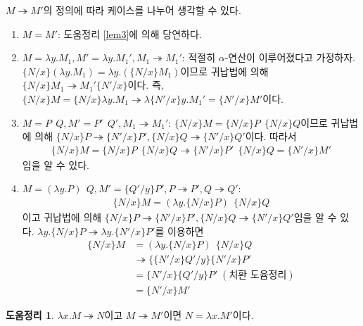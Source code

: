 \documentclass[b5paper, 11pt]{book}
\theoremstyle{definition}
\newtheorem{lem}[defn]{도움정리}
\newenvironment{pf*}{\pushQED{\qed}\pf}
{\popQED\endpf}
\begin{document}
\begin{pf*}
    $M \twoheadrightarrow M'$의 정의에 따라 케이스를 나누어 생각할 수 있다.
    \begin{enumerate}
        \item $M = M'$: 도움정리 \ref{lem3}에 의해 당연하다.
        \item $M = \lambda y. M_1, M' = \lambda y. M_1', M_1 \twoheadrightarrow M_1'$: 적절히 $\alpha$-연산이 이루어졌다고 가정하자. $ \{N / x\}(\lambda y. M_1) =  \lambda y. (\{N / x\} M_1)$이므로 귀납법에 의해 $\{ N / x \} M_1 \twoheadrightarrow M_1' \{N' / x\}$이다. 즉, $\{N / x\} M = \{N / x \} \lambda y. M_1 \twoheadrightarrow \lambda \{N' / x\} y. M_1' = \{N' / x\} M' $이다.
        \item $ M = P \;\, Q, M' = P' \;\, Q', M_1 \twoheadrightarrow M_1' $: $ \{N / x\}M = \{N / x \} P \;\, \{N / x\} Q$이므로 귀납법에 의해 $\{N / x\} P 
    \twoheadrightarrow \{N' / x \} P', \{N / x \} Q \twoheadrightarrow \{N' / x \} Q'$이다. 따라서 
        \begin{align*}
            \{N / x \} M = \{N / x \} P \;\, \{N / x\} Q \twoheadrightarrow \{N' / x \} P' \;\,  \{N / x \} Q = \{N' / x \} M'
        \end{align*} 임을 알 수 있다.
        \item $M = (\lambda y. P) \;\, Q, M' = \{Q' / y\} P' , P \twoheadrightarrow P' , Q \twoheadrightarrow Q'$:
        \begin{align*}
            \{N / x \} M = (\lambda y. \{N /x \} P) \;\, \{N /x \} Q 
        \end{align*}
        이고 귀납법에 의해 $ \{N / x\} P \twoheadrightarrow \{N' / x \} P',  \{N / x\} Q \twoheadrightarrow \{N' / x \} Q'$임을 알 수 있다. $\lambda y. \{N / x\} P  \twoheadrightarrow \lambda y. \{N' / x\} P' $를 이용하면
        \begin{align*}
            \{N / x\}M &= (\lambda y. \{N / x \} P )\;\, \{N / x\} Q \\ 
            &\twoheadrightarrow \{ \{N' / x\} Q' / y \} \{N' / x\} P' \\ 
            &= \{N' / x\}\{ Q' / y \} P' \; (\text{치환 도윰정리})\\ 
            &= \{N' / x\} M'
        \end{align*}
    \end{enumerate}
\end{pf*}
\begin{lem}\label{A5}
   $\lambda x. M \twoheadrightarrow N$이고 $M \twoheadrightarrow M'$이면 $N = \lambda x.M'$이다.
\end{lem}
\end{document}
